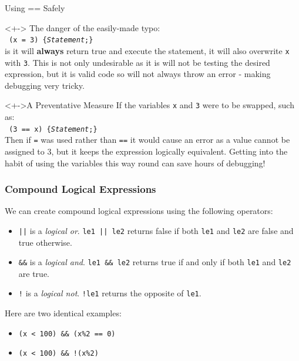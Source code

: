 \documentclass[smaller,handout,table]{beamer}
\begin{document}
\begin{frame}{Using == Safely}
\begin{block}<+->{}
The danger of the easily-made typo:\\
\texttt{ (x \alert{=} 3) \{\emph{Statement};\}}\\
is it will \textbf{always} return true and execute the statement, it will also overwrite \texttt{x} with \texttt{3}. This is not only undesirable as it is will not be testing the desired expression, but it is valid code so will not always throw an error - making debugging very tricky.
\end{block}
\begin{block}<+->{A Preventative Measure}
If the variables \texttt{x} and \texttt{3} were to be swapped, such as:\\
\texttt{ (3 \alert{==} x) \{\emph{Statement};\}}\\
Then if \texttt{=} was used rather than \texttt{==} it would cause an error as a value cannot be assigned to 3, but it keeps the expression logically equivalent. Getting into the habit of using the variables this way round can save hours of debugging!
\end{block}
\end{frame}

\begin{frame}
\frametitle{Compound Logical Expressions}
We can create compound logical expressions using the following operators:
\begin{itemize}
 \item {\tt ||} is a \emph{logical or}. {\tt le1 || le2} returns false if both {\tt le1} and {\tt le2} are false and true otherwise.
 \item {\tt \&\&} is a \emph{logical and}. {\tt le1 \&\& le2} returns true if and only if both {\tt le1} and {\tt le2} are true.
 \item {\tt !} is a \emph{logical not}. {\tt !le1} returns the opposite of {\tt le1}.
\end{itemize}
Here are two identical examples:
\begin{itemize}
\item \tt (x < 100) \&\& (x\%2 == 0)\\
\item \tt (x < 100) \&\& !(x\%2)
\end{itemize}
\end{frame}
\end{document}
